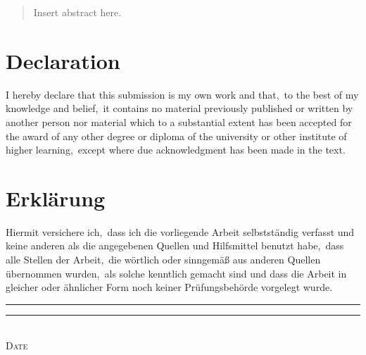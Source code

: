 \begin{abstract}
Insert abstract here.
\end{abstract}

\pagestyle{scrplain} %
\section*{Declaration}
I hereby declare that this submission is my own work and that,\ to the best of my
knowledge and belief,\ it contains no material previously published or written by another
person nor material which to a substantial extent has been accepted for the award of any
other degree or diploma of the university or other institute of higher learning,\ except
where due acknowledgment has been made in the text\@.

\section*{Erkl\"{a}rung}
{
Hiermit versichere ich,\ dass ich die vorliegende Arbeit selbstst\"{a}ndig verfasst und keine
anderen als die angegebenen Quellen und Hilfsmittel benutzt habe,\ dass alle Stellen
der Arbeit,\ die w\"{o}rtlich oder sinngem\"{a}\ss{} aus anderen Quellen \"{u}bernommen wurden,\ als
solche kenntlich gemacht sind und dass die Arbeit in gleicher oder \"{a}hnlicher Form noch
keiner Pr\"{u}fungsbeh\"{o}rde vorgelegt wurde\@.}

\vspace{2cm}
\rule{4cm}{0.1pt} \hfill \rule{7cm}{0.1pt} \\
\hspace*{1.75cm} \textsc{Date} \hspace*{6.8cm} \textsc{\@author}

\cleardoublepage
\pagestyle{scrheadings} %

\tableofcontents

\cleardoublepage
